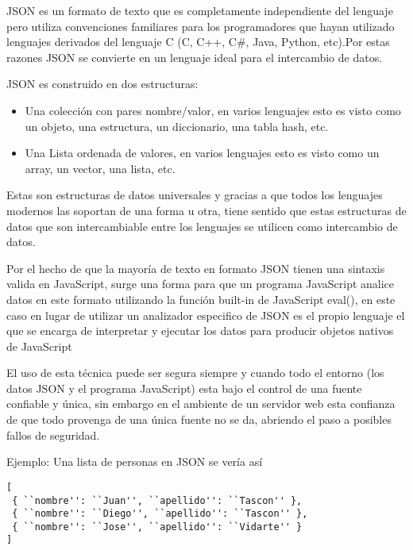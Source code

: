 JSON es un formato de texto que es completamente independiente del lenguaje pero utiliza convenciones familiares para los programadores que hayan utilizado lenguajes derivados del lenguaje C (C, C++, C\#, Java, Python, etc).\newline Por estas razones JSON se convierte en un lenguaje ideal para el intercambio de datos.

JSON es construido en dos estructuras:

\begin{itemize}

	\item Una colección con pares nombre/valor, en varios lenguajes esto es visto como un objeto, una estructura, un diccionario, una tabla hash, etc.
	
	\item Una Lista ordenada de valores, en varios lenguajes esto es visto como un array, un vector, una lista, etc.

\end{itemize}

Estas son estructuras de datos universales y gracias a que todos los lenguajes modernos las soportan de una forma u otra, tiene sentido que estas estructuras de datos que son intercambiable entre los lenguajes se utilicen como intercambio de datos.

Por el hecho de que la mayoría de texto en formato JSON tienen una sintaxis valida en JavaScript, surge una forma para que un programa JavaScript analice datos en este formato utilizando la función built-in de JavaScript eval(), en este caso en lugar de utilizar un analizador especifico de JSON es el propio lenguaje el que se encarga de interpretar y ejecutar los datos para producir objetos nativos de JavaScript 

El uso de esta técnica puede ser segura siempre y cuando todo el entorno (los datos JSON y el programa JavaScript) esta bajo el control de una fuente confiable y única, sin embargo en el ambiente de un servidor web esta confianza de que todo provenga de una única fuente no se da, abriendo el paso a posibles fallos de seguridad.

Ejemplo: Una lista de personas en JSON se vería así

\begin{verbatim}
[
 { ``nombre'': ``Juan'', ``apellido'': ``Tascon'' },
 { ``nombre'': ``Diego'', ``apellido'': ``Tascon'' },
 { ``nombre'': ``Jose'', ``apellido'': ``Vidarte'' }
]
\end{verbatim}

